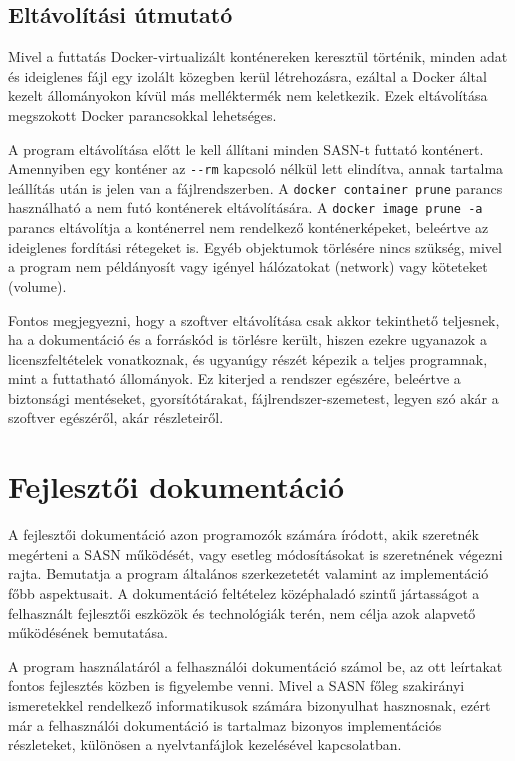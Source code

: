 \documentclass[twoside, 12pt]{report}
\begin{document}
\section{Eltávolítási útmutató}

Mivel a futtatás Docker-virtualizált konténereken keresztül történik, minden adat és ideiglenes fájl egy izolált közegben kerül létrehozásra, ezáltal a Docker által kezelt állományokon kívül más melléktermék nem keletkezik. Ezek eltávolítása megszokott Docker parancsokkal lehetséges.

A program eltávolítása előtt le kell állítani minden SASN-t futtató konténert. Amennyiben egy konténer az \verb|--rm| kapcsoló nélkül lett elindítva, annak tartalma leállítás után is jelen van a fájlrendszerben. A \verb|docker container prune| parancs használható a nem futó konténerek eltávolítására. A \verb|docker image prune -a| parancs eltávolítja a konténerrel nem rendelkező konténerképeket, beleértve az ideiglenes fordítási rétegeket is. Egyéb objektumok törlésére nincs szükség, mivel a program nem példányosít vagy igényel hálózatokat (network) vagy köteteket (volume).

Fontos megjegyezni, hogy a szoftver eltávolítása csak akkor tekinthető teljesnek, ha a dokumentáció és a forráskód is törlésre került, hiszen ezekre ugyanazok a licenszfeltételek vonatkoznak, és ugyanúgy részét képezik a teljes programnak, mint a futtatható állományok. Ez kiterjed a rendszer egészére, beleértve a biztonsági mentéseket, gyorsítótárakat, fájlrendszer-szemetest, legyen szó akár a szoftver egészéről, akár részleteiről.

\chapter{Fejlesztői dokumentáció}

A fejlesztői dokumentáció azon programozók számára íródott, akik szeretnék megérteni a SASN működését, vagy esetleg módosításokat is szeretnének végezni rajta. Bemutatja a program általános szerkezetetét valamint az implementáció főbb aspektusait. A dokumentáció feltételez középhaladó szintű jártasságot a felhasznált fejlesztői eszközök és technológiák terén, nem célja azok alapvető működésének bemutatása.

A program használatáról a felhasználói dokumentáció számol be, az ott leírtakat fontos fejlesztés közben is figyelembe venni. Mivel a SASN főleg szakirányi ismeretekkel rendelkező informatikusok számára bizonyulhat hasznosnak, ezért már a felhasználói dokumentáció is tartalmaz bizonyos implementációs részleteket, különösen a nyelvtanfájlok kezelésével kapcsolatban.
\end{document}
